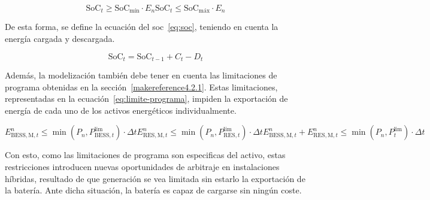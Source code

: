 \begin{subequations}%
  \label{eq:limite-soc}

  \begin{equation}
    \text{SoC}_{t} \ge \text{SoC}_{\text{mín}} \cdot E_{n}
  \end{equation}

  \begin{equation}
    \text{SoC}_{t} \le \text{SoC}_{\text{máx}} \cdot E_{n}
  \end{equation}

\end{subequations}

De esta forma, se define la ecuación del \gls{soc}~\ref{eq:soc}, teniendo en cuenta la energía cargada y descargada.

\begin{equation}%
  \label{eq:soc}
  \text{SoC}_{t} = \text{SoC}_{t - 1} + C_{t} - D_{t}
\end{equation}

Además, la modelización también debe tener en cuenta las limitaciones de programa obtenidas en la sección~\ref{makereference4.2.1}. Estas limitaciones, representadas en la ecuación~\ref{eq:limite-programa}, impiden la exportación de energía de cada uno de los activos energéticos individualmente.

\begin{subequations}%
  \label{eq:limite-programa}

  \begin{equation}
    E^{n}_{\text{BESS}, \text{M}, t} \le \min(P_{n}, P^{\text{lim}}_{\text{BESS}, t}) \cdot \Delta t
  \end{equation}

  \begin{equation}
    E^{n}_{\text{RES}, \text{M}, t} \le \min(P_{n}, P^{\text{lim}}_{\text{RES}, t}) \cdot \Delta t
  \end{equation}

  \begin{equation}
    E^{n}_{\text{BESS}, \text{M}, t} + E^{n}_{\text{RES}, \text{M}, t} \le \min(P_{n}, P^{\text{lim}}_{t}) \cdot \Delta t
  \end{equation}

\end{subequations}

Con esto, como las limitaciones de programa son especificas del activo, estas restricciones introducen nuevas oportunidades de arbitraje en instalaciones híbridas, resultado de que generación se vea limitada sin estarlo la exportación de la batería. Ante dicha situación, la batería es capaz de cargarse sin ningún coste.

